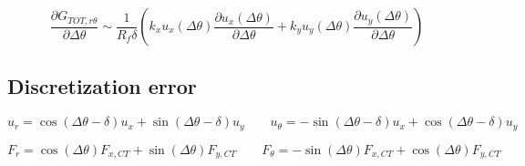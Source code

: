 \documentclass[a4paper]{jpconf}
\begin{document}
\begin{equation}
\frac{\partial G_{TOT,r\theta}}{\partial\Delta\theta} \sim\frac{1}{R_{f}\delta}\left( k_{x}u_{x}\left(\Delta\theta\right)\frac{\partial u_{x}\left(\Delta\theta\right)}{\partial\Delta\theta}+ k_{y}u_{y}\left(\Delta\theta\right)\frac{\partial u_{y}\left(\Delta\theta\right)}{\partial\Delta\theta}\right)
\end{equation}

\subsection{Discretization error}

\begin{equation}
u_{r}=\cos\left(\Delta\theta-\delta\right) u_{x}+\sin\left(\Delta\theta-\delta\right) u_{y}\qquad u_{\theta}=-\sin\left(\Delta\theta-\delta\right) u_{x}+\cos\left(\Delta\theta-\delta\right) u_{y}
\end{equation}

\begin{equation}
F_{r}=\cos\left(\Delta\theta\right) F_{x,CT}+\sin\left(\Delta\theta\right) F_{y,CT}\qquad F_{\theta}=-\sin\left(\Delta\theta\right) F_{x,CT}+\cos\left(\Delta\theta\right) F_{y,CT}
\end{equation}
\end{document}
